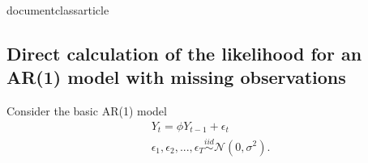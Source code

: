 

documentclass{article}
\usepackage[utf8]{inputenc}



\usepackage{geometry}                		
\geometry {letterpaper, left=2.5 cm, right=2.5 cm, top=2.5cm, bottom=2.5 cm}    


\usepackage{graphicx}		
\graphicspath{ {c:} }
\usepackage{setspace}
\usepackage[version=4]{mhchem}
\doublespace
\usepackage{siunitx}
\usepackage{natbib}
\usepackage{amsmath}
\usepackage{amsfonts}
\usepackage{lineno}
\usepackage[sharp]{easylist}%

\maketitle


\subsection*{Direct calculation of the likelihood for an AR(1) model with missing observations}

Consider the basic AR(1) model
\begin{equation*}
  \begin{split}
      Y_t = \phi Y_{t-1} + \epsilon_t\\
      \epsilon_1,\epsilon_2,...,\epsilon_T \overset{iid}{\sim} \mathcal{N}(0, \sigma^2).
  \end{split}
\end{equation*}

